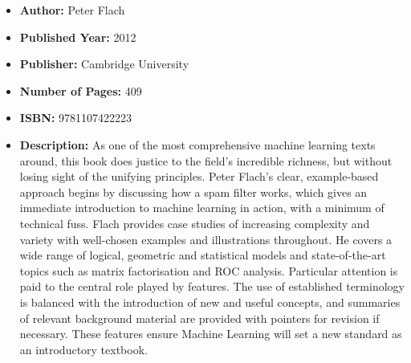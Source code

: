 \documentclass{tufte-handout}
\begin{document}
\begin{itemize}
    \item[] \textbf{Author:} Peter Flach
    \item[] \textbf{Published Year:} 2012
    \item[] \textbf{Publisher:} Cambridge University
    \item[] \textbf{Number of Pages:} 409      
    \item[] \textbf{ISBN:} 9781107422223
    \item[] \textbf{Description:} As one of the most comprehensive machine learning texts around, this book does justice to the field's incredible richness, but without losing sight of the unifying principles. Peter Flach's clear, example-based approach begins by discussing how a spam filter works, which gives an immediate introduction to machine learning in action, with a minimum of technical fuss. Flach provides case studies of increasing complexity and variety with well-chosen examples and illustrations throughout. He covers a wide range of logical, geometric and statistical models and state-of-the-art topics such as matrix factorisation and ROC analysis. Particular attention is paid to the central role played by features. The use of established terminology is balanced with the introduction of new and useful concepts, and summaries of relevant background material are provided with pointers for revision if necessary. These features ensure Machine Learning will set a new standard as an introductory textbook.
\end{itemize}
\end{document}
